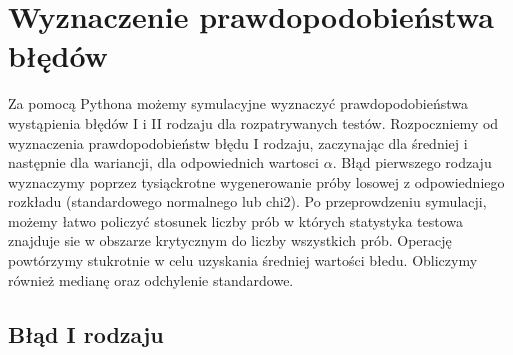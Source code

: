 \documentclass{article}
\begin{document}

\section{Wyznaczenie prawdopodobieństwa błędów}
Za pomocą Pythona możemy symulacyjne wyznaczyć prawdopodobieństwa wystąpienia błędów I i II rodzaju dla rozpatrywanych testów. Rozpoczniemy od wyznaczenia prawdopodobieństw błędu I rodzaju, zaczynając dla średniej i następnie dla wariancji, dla odpowiednich wartosci $\alpha$. Błąd pierwszego rodzaju wyznaczymy poprzez tysiąckrotne wygenerowanie próby losowej
z odpowiedniego rozkładu (standardowego normalnego lub chi2). Po przeprowdzeniu symulacji, możemy łatwo policzyć stosunek liczby prób w których statystyka testowa znajduje sie w obszarze krytycznym do liczby wszystkich prób. Operację powtórzymy stukrotnie  w celu uzyskania średniej wartości błedu. Obliczymy również medianę oraz odchylenie standardowe.
\subsection{Błąd I rodzaju}
\end{document}
